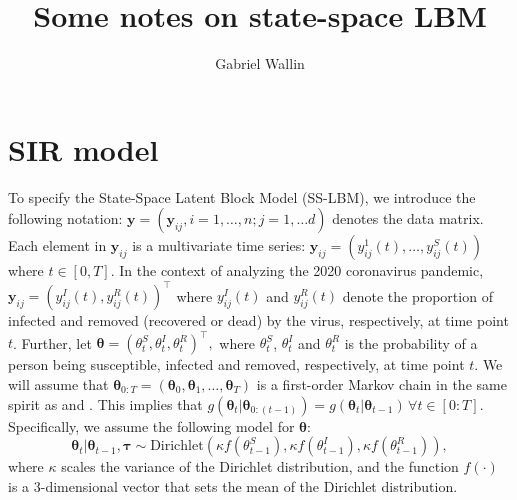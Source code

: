 \documentclass[10pt,a4paper]{article}
\author{Gabriel Wallin}
\title{Some notes on state-space LBM}
\begin{document}
\maketitle

\section{SIR model}
To specify the State-Space Latent Block Model (SS-LBM), we introduce the following notation: 
%
$
\mathbf{y} = (\mathbf{y}_{ij}, i = 1, \ldots, n; j = 1, \ldots d) 
$
%
denotes the data matrix. Each element in $\mathbf{y}_{ij}$ is a multivariate time series:  
%
$
\mathbf{y}_{ij} = (y_{ij}^1(t), \ldots, y_{ij}^S(t))
$ 
%
where $t \in [0, T]$. In the context of analyzing the 2020 coronavirus pandemic, 
%
$
\mathbf{y}_{ij} = (y_{ij}^I(t), y_{ij}^R(t))^\top
$
%
where $y_{ij}^I(t)$ and $y_{ij}^R(t)$ denote the proportion of infected and removed (recovered or dead) by the virus, respectively, at time point $t$. Further, let  
%
$
\boldsymbol{\theta} = (\theta_t^S, \theta_t^I, \theta_t^R)^\top,
$
%
where $\theta_t^S$, $\theta_t^I$ and $\theta_t^R$ is the probability of a person being susceptible, infected and removed, respectively, at time point $t$. We will assume that 
%
$
\boldsymbol{\theta}_{0:T} = (\boldsymbol{\theta}_0, \boldsymbol{\theta}_1, \ldots, \boldsymbol{\theta}_T)
$
%
is a first-order Markov chain in the same spirit as \parencite{osthus2017forecasting} and \parencite{song2020epidemiological}. This implies that 
%
$
g(\boldsymbol{\theta}_t|\boldsymbol{\theta}_{0:(t-1)}) = g(\boldsymbol{\theta}_t|\boldsymbol{\theta}_{t-1}) \, \forall t \in [0:T]. 
$
%
Specifically, we assume the following model for $\boldsymbol{\theta}$:
%
$$
\boldsymbol{\theta}_t | \boldsymbol{\theta}_{t-1}, \boldsymbol{\tau} \sim \text{Dirichlet}(\kappa f(\theta_{t-1}^S), \kappa f(\theta_{t-1}^I), \kappa f(\theta_{t-1}^R)),
$$
where $\kappa$ scales the variance of the Dirichlet distribution, and the function $f(\cdot)$ is a 3-dimensional vector that sets the mean of the Dirichlet distribution.
%
\end{document}
